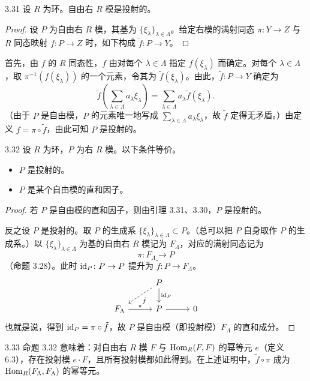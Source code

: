 \begin{lemma}{3.31} 设 $R$ 为环。自由右 $R$ 模是投射的。
\end{lemma}

\begin{proof}
设 $P$ 为自由右 $R$ 模，其基为 $\{\xi_\lambda\}_{\lambda\in\Lambda}$。给定右模的满射同态 $\pi\colon Y\to Z$ 与 $R$ 同态映射 $f\colon P\to Z$ 时，如下构成 $\tilde f\colon P\to Y$。
\end{proof}

首先，由 $f$ 的 $R$ 同态性，$f$ 由对每个 $\lambda\in\Lambda$ 指定 $f(\xi_\lambda)$ 而确定。对每个 $\lambda\in\Lambda$，取 $\pi^{-1}(f(\xi_\lambda))$ 的一个元素，令其为 $\tilde f(\xi_\lambda)$。由此，$\tilde f\colon P\to Y$ 确定为
\[
\tilde f\left(\sum_{\lambda\in\Lambda}a_\lambda\xi_\lambda\right)=\sum_{\lambda\in\Lambda}a_\lambda\tilde f(\xi_\lambda).
\]
（由于 $P$ 是自由模，$P$ 的元素唯一地写成 $\sum_{\lambda\in\Lambda}a_\lambda\xi_\lambda$，故 $\tilde f$ 定得无矛盾。）由定义 $f=\pi\circ\tilde f$，由此可知 $P$ 是投射的。

\begin{proposition}{3.32}
设 $R$ 为环，$P$ 为右 $R$ 模。以下条件等价。
\begin{itemize}
\item $P$ 是投射的。
\item $P$ 是某个自由模的直和因子。
\end{itemize}
\end{proposition}

\begin{proof}
若 $P$ 是自由模的直和因子，则由引理 3.31、3.30，$P$ 是投射的。

反之设 $P$ 是投射的。取 $P$ 的生成系 $\{\xi_\lambda\}_{\lambda\in\Lambda}\subset P$。（总可以把 $P$ 自身取作 $P$ 的生成系。）以 $\{\xi_\lambda\}_{\lambda\in\Lambda}$ 为基的自由右 $R$ 模记为 $F_\Lambda$，对应的满射同态记为
\[
\pi\colon F_\Lambda\to P
\]
（命题 3.28）。此时 $\mathrm{id}_P\colon P\to P$ 提升为 $\tilde f\colon P\to F_\Lambda$。
\[
\begin{tikzcd}[row sep=1.7em, column sep=2.8em]
& P \arrow[dl,dashed,"\tilde f"] \arrow[d,"\id_P"] & \\
F_\Lambda \arrow[r,"\pi"] & P \arrow[r] & 0
\end{tikzcd}
\]
也就是说，得到 $\mathrm{id}_P=\pi\circ\tilde f$，故 $P$ 是自由模（即投射模）$F_\Lambda$ 的直和成分。
\end{proof}

\begin{remark}{3.33} 命题 3.32 意味着：对自由右 $R$ 模 $F$ 与 $\operatorname{Hom}_R(F,F)$ 的幂等元 $e$（定义 6.3），存在投射模 $e\cdot F$，且所有投射模都如此得到。在上述证明中，$\tilde f\circ\pi$ 成为 $\operatorname{Hom}_R(F_\Lambda,F_\Lambda)$ 的幂等元。
\end{remark}

